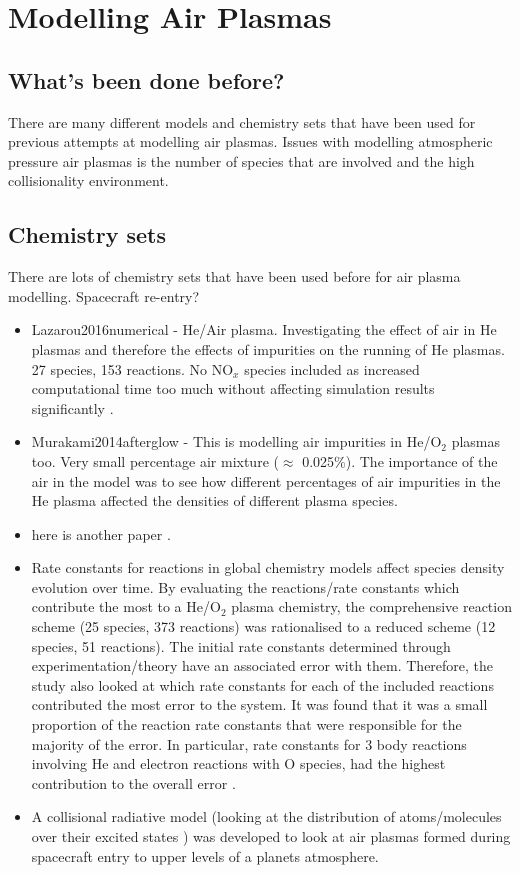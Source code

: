 \documentclass[11pt, oneside]{article}   	%
\begin{document}
\section{Modelling Air Plasmas}
\subsection{What's been done before?} 
There are many different models and chemistry sets that have been used for previous attempts at modelling air plasmas. 
Issues with modelling atmospheric pressure air plasmas is the number of species that are involved and the high collisionality environment.
\subsection{Chemistry sets}
There are lots of chemistry sets that have been used before for air plasma modelling.
Spacecraft re-entry? 
\begin{itemize}
\item Lazarou2016numerical - He/Air plasma. Investigating the effect of air in He plasmas and therefore the effects of impurities on the running of He plasmas. 27 species, 153 reactions. No NO$_x$ species included as increased computational time too much without affecting simulation results significantly \cite{Lazarou2016numerical}.
\item Murakami2014afterglow -  This is modelling air impurities in He/O$_2$ plasmas too. Very small percentage air mixture ($\approx$ 0.025\%). The importance of the air in the model was to see how different percentages of air impurities in the He plasma affected the densities of different plasma species.\cite{Murakami2014afterglow}
\item here is another paper \cite{Gordiets1995kinetic}.
\item Rate constants for reactions in global chemistry models affect species density evolution over time. 
By evaluating the reactions/rate constants which contribute the most to a He/O$_2$ plasma chemistry, the comprehensive reaction scheme (25 species, 373 reactions) was rationalised to a reduced scheme (12 species, 51 reactions). The initial rate constants determined through experimentation/theory have an associated error with them. Therefore, the study also looked at which rate constants for each of the included reactions contributed the most error to the system. It was found that it was a small proportion of the reaction rate constants that were responsible for the majority of the error. In particular, rate constants for 3 body reactions involving He and electron reactions with O species, had the highest contribution to the overall error \cite{Turner2016uncertainty}.
\item A collisional radiative model (looking at the distribution of atoms/molecules over their excited states \cite{Sijde1984collisional}) was developed to look at air plasmas formed during spacecraft entry to upper levels of a planets atmosphere. 


\end{itemize}
\end{document}
